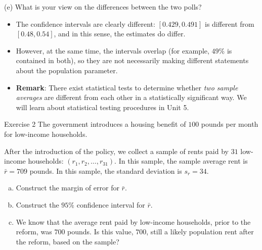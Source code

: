 \documentclass[
  11pt,
  ignorenonframetext,
]{beamer}
\providecommand{\tightlist}{%
  \setlength{\itemsep}{0pt}\setlength{\parskip}{0pt}}
\begin{document}
\begin{frame}{(e) What is your view on the differences between the two
polls?}
\protect\hypertarget{e-what-is-your-view-on-the-differences-between-the-two-polls}{}
\pause

\begin{itemize}
\item
  The confidence intervals are clearly different: \([0.429, 0.491]\) is
  different from \([0.48, 0.54]\), and in this sense, the estimates do
  differ.
\item
  However, at the same time, the intervals overlap (for example,
  \(49\%\) is contained in both), so they are not necessarily making
  different statements about the population parameter.
\item
  \textbf{Remark}: There exist statistical tests to determine whether
  \emph{two sample averages} are different from each other in a
  statistically significant way. We will learn about statistical testing
  procedures in Unit 5.
\end{itemize}
\end{frame}

\begin{frame}{Exercise 2}
\protect\hypertarget{exercise-2}{}
The government introduces a housing benefit of \(100\) pounds per month
for low-income households.

After the introduction of the policy, we collect a sample of rents paid
by \(31\) low-income households: \((r_1, r_2, \ldots , r_{31})\). In
this sample, the sample average rent is \(\bar{r} = 709\) pounds. In
this sample, the standard deviation is \(s_r = 34\).

\begin{enumerate}
[(a)]
\tightlist
\item
  Construct the margin of error for \(\bar{r}\).
\item
  Construct the \(95\%\) confidence interval for \(\bar{r}\).
\item
  We know that the average rent paid by low-income households, prior to
  the reform, was \(700\) pounds. Is this value, \(700\), still a likely
  population rent after the reform, based on the sample?
\end{enumerate}
\end{frame}
\end{document}
